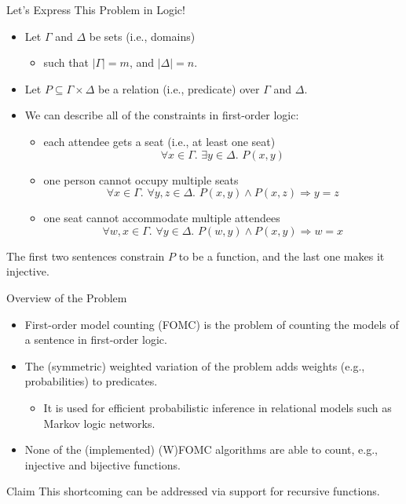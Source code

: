 \documentclass{beamer}
\begin{document}
\begin{frame}{Let's Express This Problem in Logic!}
  \begin{itemize}
    \item Let \alert{$\Gamma$} and \alert{$\Delta$} be sets (i.e., domains)
    \begin{itemize}
      \item such that \alert{$|\Gamma| = m$}, and \alert{$|\Delta| = n$}.
    \end{itemize}
    \item Let \alert{$P \subseteq \Gamma \times \Delta$} be a relation (i.e.,
          predicate) over \alert{$\Gamma$} and \alert{$\Delta$}.
    \item We can describe all of the constraints in first-order logic:
    \begin{itemize}
      \item \pause each attendee gets a seat (i.e., at least one seat)
      \[
        \forall x \in \Gamma\text{. }\exists y \in \Delta\text{. }P(x, y)
      \]
      \item \pause one person cannot occupy multiple seats
      \[
        \forall x \in \Gamma\text{. }\forall y, z \in \Delta\text{. }P(x, y) \land P(x, z) \Rightarrow y=z
      \]
      \item \pause one seat cannot accommodate multiple attendees
      \[
        \forall w, x \in \Gamma\text{. }\forall y \in \Delta\text{. }P(w, y) \land P(x, y) \Rightarrow w=x
      \]
    \end{itemize}
  \end{itemize}
  \pause The first two sentences constrain \alert{$P$} to be a function, and the
  last one makes it injective.
\end{frame}

\begin{frame}{Overview of the Problem}
  \begin{itemize}
    \item \alert{First-order model counting} (FOMC) is the problem of counting
          the models of a sentence in first-order logic.
    \item The \alert{(symmetric) weighted} variation of the problem adds weights
          (e.g., probabilities) to predicates.
          \begin{itemize}
            \item It is used for efficient \alert{probabilistic inference} in
                  relational models such as Markov logic networks.
          \end{itemize}
    \item None of the (implemented) (W)FOMC algorithms are able to count, e.g.,
          \alert{injective} and \alert{bijective} functions.
  \end{itemize}
  \begin{block}{Claim}
    This shortcoming can be addressed via support for \alert{recursive functions}.
  \end{block}
\end{frame}
\end{document}
